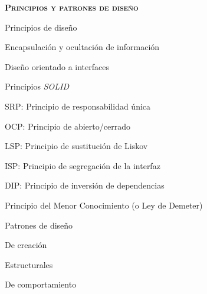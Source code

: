 \begin{longenum}
\begin{longenum}
    \end{longenum}
    \item \textbf{\textsc{Principios y patrones de diseño}} \ \ \ \ \ \opcional\ \ \
    \begin{longenum}
        \item Principios de diseño
        \begin{longenum}
            \item Encapsulación y ocultación de información
            \item Diseño orientado a interfaces
            \item Principios \textit{SOLID}
            \begin{longenum}
                \item SRP: Principio de responsabilidad única
                \item OCP: Principio de abierto/cerrado
                \item LSP: Principio de sustitución de Liskov
                \item ISP: Principio de segregación de la interfaz
                \item DIP: Principio de inversión de dependencias
            \end{longenum}
            \item Principio del Menor Conocimiento (o Ley de Demeter)
        \end{longenum}
        \item Patrones de diseño
        \begin{longenum}
            \item De creación
            \item Estructurales
            \item De comportamiento
        \end{longenum}
    \end{longenum}
\end{longenum}

